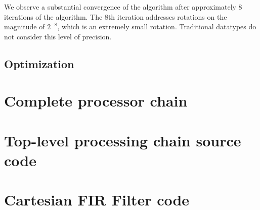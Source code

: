 \documentclass[11pt]{report}
\begin{document}
We observe a substantial convergence of the algorithm after approximately 8 iterations of the algorithm. The 8th iteration addresses rotations on the magnitude of $2^{-8}$, which is an extremely small rotation. Traditional  datatypes do not consider this level of precision.

\section{Optimization}

\chapter{Complete processor chain}




\begin{appendices}
    \chapter{Top-level processing chain source code}
        \begin{singlespace}
            
        \end{singlespace}

        \begin{singlespace}
            
        \end{singlespace}

	\chapter{Cartesian FIR Filter code}
        \begin{singlespace}
            
        \end{singlespace}

        \begin{singlespace}
            
        \end{singlespace}
        

\end{appendices}
\end{document}
